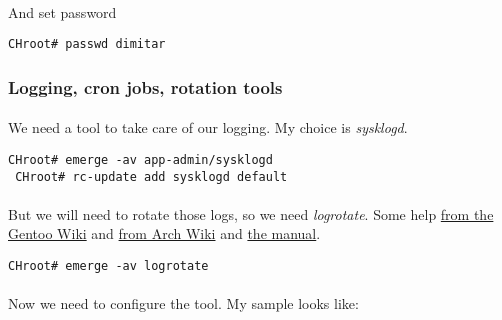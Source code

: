 \documentclass[11pt,a4paper]{article}
\begin{document}
                    \paragraph{} And set password

                    \begin{lstlisting}[style=BashInputCHRoot]
 CHroot# passwd dimitar
                    \end{lstlisting}

                \newpage
                \subsubsection{Logging, cron jobs, rotation tools}

                    \paragraph{} We need a tool to take care of our logging. My choice is \textit{sysklogd}.

                    \begin{lstlisting}[style=BashInputCHRoot]
 CHroot# emerge -av app-admin/sysklogd
 CHroot# rc-update add sysklogd default
                    \end{lstlisting}

                    \paragraph{} But we will need to rotate those logs, so we need \textit{logrotate}. Some help \href{https://wiki.gentoo.org/wiki/Logrotate}{from the Gentoo Wiki} and \href{https://wiki.archlinux.org/index.php/logrotate}{from Arch Wiki} and \href{https://linuxconfig.org/logrotate-8-manual-page}{the manual}.

                    \begin{lstlisting}[style=BashInputCHRoot]
 CHroot# emerge -av logrotate
                    \end{lstlisting}

                    \paragraph{} Now we need to configure the tool. My sample looks like:

                    
\end{document}
